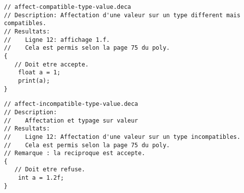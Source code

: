 \documentclass[12pt, a4paper, one side]{article}
\begin{document}
\begin{lstlisting}
// affect-compatible-type-value.deca
// Description: Affectation d'une valeur sur un type different mais compatibles.
// Resultats:
//    Ligne 12: affichage 1.f.
//    Cela est permis selon la page 75 du poly.
{
   // Doit etre accepte.
    float a = 1;
    print(a);
}
\end{lstlisting}

\begin{lstlisting}
// affect-incompatible-type-value.deca
// Description:
//    Affectation et typage sur valeur
// Resultats:
//    Ligne 12: Affectation d'une valeur sur un type incompatibles.
//    Cela est permis selon la page 75 du poly.
// Remarque : la reciproque est accepte.
{
   // Doit etre refuse.
    int a = 1.2f;
}
\end{lstlisting}
\end{document}
